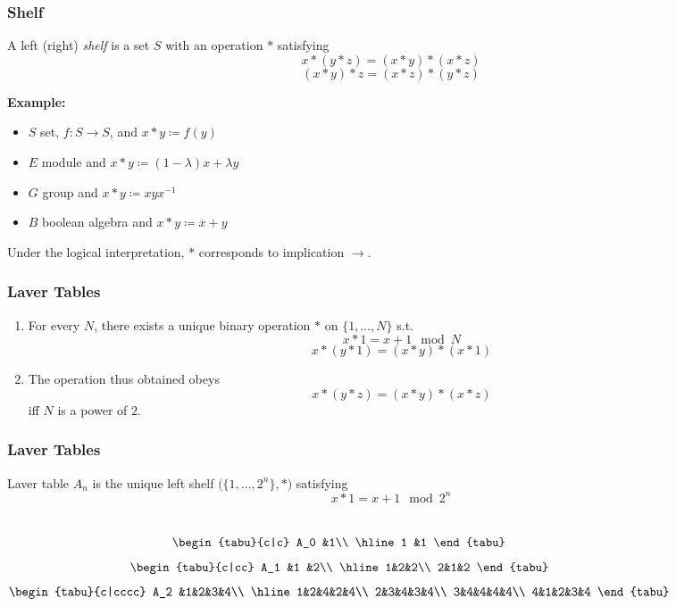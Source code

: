 \documentclass[UTF8,aspectratio=43,11pt,colorlinks,compress,openany]{beamer}%
\begin{document}
\begin{frame}\frametitle{Shelf}
\setlength\abovedisplayskip{0pt}
\setlength\belowdisplayskip{0pt}
	\begin{definition}[Shelf]
	A left (right) \emph{shelf} is a set $S$ with an operation $*$ satisfying
	\[x*(y*z)=(x*y)*(x*z)\tag{left self-distributive}\]
	\[(x*y)*z=(x*z)*(y*z)\tag{right self-distributive}\]
	\end{definition}
	\textbf{Example:} 
	\begin{itemize}
		\item $S$ set, $f: S\to S$, and $x*y\coloneqq f(y)$
		\item $E$ module and $x*y\coloneqq (1-\lambda)x+\lambda y$
		\item $G$ group and $x*y\coloneqq xyx^{-1}$
		\item $B$ boolean algebra and $x*y\coloneqq \overline{x}+y$
	\end{itemize}
	Under the logical interpretation, $*$ corresponds to implication $\to$.
\end{frame}

\begin{frame}\frametitle{Laver Tables}
	\begin{theorem}[Laver]
	\begin{enumerate}
		\item For every $N$, there exists a unique binary operation $*$ on $\{1,\dots,N\}$ s.t. 
		\[x*1=x+1\mod N\]
		\[x*(y*1)=(x*y)*(x*1)\]
		\item The operation thus obtained obeys
		\[x*(y*z)=(x*y)*(x*z)\]
		iff $N$ is a power of $2$.
	\end{enumerate}
	\end{theorem}
\end{frame}

\begin{frame}\frametitle{Laver Tables}
	\begin{definition}
	Laver table $A_n$ is the unique left shelf $\big(\{1,\dots,2^n\},*\big)$ satisfying
	\[x*1=x+1\mod 2^n\]
	\end{definition}
\begin{columns}
\[
\begin{tabu}{c|c}
A_0 &1\\
\hline
1 &1
\end{tabu}
\]
\[
\begin{tabu}{c|cc}
A_1 &1 &2\\
\hline
1&2&2\\
2&1&2
\end{tabu}
\]
\[
\begin{tabu}{c|cccc}
A_2 &1&2&3&4\\
\hline
1&2&4&2&4\\
2&3&4&3&4\\
3&4&4&4&4\\
4&1&2&3&4
\end{tabu}
\]
\end{columns}\vspace*{7pt}
\centering{}
\end{frame}
\end{document}
